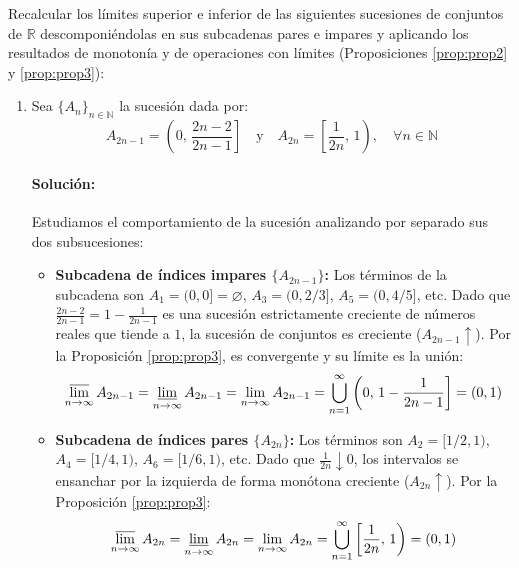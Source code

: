 \begin{problema}
Recalcular los límites superior e inferior de las siguientes sucesiones de conjuntos de $\mathbb{R}$ descomponiéndolas en sus subcadenas pares e impares y aplicando los resultados de monotonía y de operaciones con límites (Proposiciones \ref{prop:prop2} y \ref{prop:prop3}):

\begin{enumerate}[label=\arabic*)]
    \item Sea $\{A_n\}_{n \in \mathbb{N}}$ la sucesión dada por:
    \[
        A_{2n-1} = \left( 0, \, \frac{2n-2}{2n-1} \right] \quad \text{y} \quad A_{2n} = \left[ \frac{1}{2n}, \, 1 \right), \quad \forall n \in \mathbb{N}
    \]

    \paragraph{Solución:}
    Estudiamos el comportamiento de la sucesión analizando por separado sus dos subsucesiones:

    \begin{itemize}
        \item \textbf{Subcadena de índices impares $\{A_{2n-1}\}$:}
        Los términos de la subcadena son $A_1 = (0,0] = \varnothing$, $A_3 = (0, 2/3]$, $A_5 = (0, 4/5]$, etc.
        Dado que $\frac{2n-2}{2n-1} = 1 - \frac{1}{2n-1}$ es una sucesión estrictamente creciente de números reales que tiende a $1$, la sucesión de conjuntos es creciente ($A_{2n-1} \uparrow$). Por la Proposición \ref{prop:prop3}, es convergente y su límite es la unión:
        \[
            \varlimsup_{n \to \infty} A_{2n-1} = \varliminf_{n \to \infty} A_{2n-1} = \lim_{n \to \infty} A_{2n-1} = \bigcup_{n=1}^\infty \left( 0, \, 1 - \frac{1}{2n-1} \right] = (0, 1)
        \]

        \item \textbf{Subcadena de índices pares $\{A_{2n}\}$:}
        Los términos son $A_2 = [1/2, 1)$, $A_4 = [1/4, 1)$, $A_6 = [1/6, 1)$, etc.
        Dado que $\frac{1}{2n} \downarrow 0$, los intervalos se ensanchar por la izquierda de forma monótona creciente ($A_{2n} \uparrow$). Por la Proposición \ref{prop:prop3}:
        \[
            \varlimsup_{n \to \infty} A_{2n} = \varliminf_{n \to \infty} A_{2n} = \lim_{n \to \infty} A_{2n} = \bigcup_{n=1}^\infty \left[ \frac{1}{2n}, \, 1 \right) = (0, 1)
        \]
    \end{itemize}


\end{enumerate}
\end{problema}
